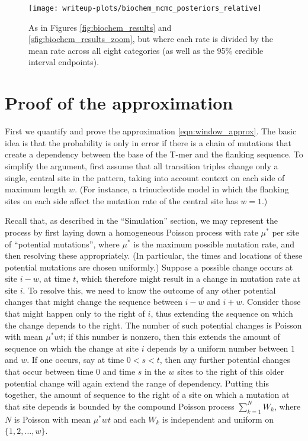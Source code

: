 \documentclass{article}
\theoremstyle{plain}
\theoremstyle{definition}
\begin{document}
\begin{figure}
    \begin{center}
        \texttt{[image: writeup-plots/biochem\_mcmc\_posteriors\_relative]}
    \end{center}
    \caption{
        As in Figures \ref{fig:biochem_results} and \ref{sfig:biochem_results_zoom},
        but where each rate is divided by the mean rate across all eight categories
        (as well as the 95\% credible interval endpoints).
        \label{sfig:biochem_results_relative}}
\end{figure}

\clearpage

\section{Proof of the approximation}
\label{ss:approx_pf}

First we quantify and prove the approximation \eqref{eqn:window_approx}.
The basic idea is that the probability is only in error if there is a chain of mutations
that create a dependency between the base of the T-mer and the flanking sequence.
To simplify the argument, first assume that all transition triples
change only a single, central site in the pattern,
taking into account context on each side of maximum length $w$.
(For instance, a trinucleotide model in which the flanking sites on each side
affect the mutation rate of the central site has $w=1$.)

Recall that, as described in the ``Simulation'' section,
we may represent the process by first laying down a homogeneous Poisson process
with rate $\mu^*$ per site of ``potential mutations'',
where $\mu^*$ is the maximum possible mutation rate,
and then resolving these appropriately.
(In particular, the times and locations of these potential mutations are chosen uniformly.)
Suppose a possible change occurs at site $i-w$, at time $t$,
which therefore might result in a change in mutation rate at site $i$.
To resolve this, we need to know the outcome of any other potential changes
that might change the sequence between $i-w$ and $i + w$.
Consider those that might happen only to the right of $i$,
thus extending the sequence on which the change depends to the right.
The number of such potential changes is Poisson with mean $\mu^* w t$;
if this number is nonzero, then
this extends the amount of sequence on which the change at site $i$ depends
by a uniform number between $1$ and $w$.
If one occurs, say at time $0 < s < t$,
then any further potential changes that occur between time 0 and time $s$
in the $w$ sites to the right of this older potential change
will again extend the range of dependency.
Putting this together, the amount of sequence to the right of a site
on which a mutation at that site depends
is bounded by the compound Poisson process $\sum_{k=1}^N W_k$,
where $N$ is Poisson with mean $\mu^* w t$
and each $W_k$ is independent and uniform on $\{1, 2, \ldots, w\}$.
\end{document}
